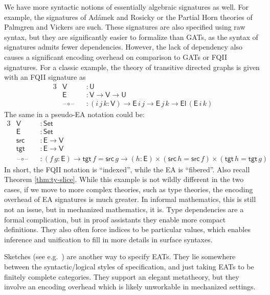 \documentclass[12pt,a4paper,twoside,openany]{book}
\theoremstyle{remark}
\theoremstyle{definition}
\theoremstyle{theorem}
\newcommand{\ms}[1]{\mathsf{#1}}
\newcommand{\U}{\mathsf{U}}
\newcommand{\El}{\mathsf{El}}
\newcommand{\blank}{\mathord{\hspace{1pt}\text{--}\hspace{1pt}}}
\newcommand{\Set}{\mathsf{Set}}
\begin{document}
We have more syntactic notions of essentially algebraic signatures as well. For
example, the signatures of Adámek and Rosicky
\cite[Section~3.D]{adamek1994locally} or the Partial Horn theories of Palmgren
and Vickers \cite{partialhorn} are such. These signatures are also specified
using raw syntax, but they are significantly easier to formalize than GATs, as
the syntax of signatures admits fewer dependencies. However, the lack of
dependency also causes a significant encoding overhead on comparison to GATs or
FQII signatures. For a classic example, the theory of transitive directed graphs
is given with an FQII signature as
\begin{alignat*}{3}
  & \ms{V} &&: \U\\
  & \ms{E} &&: \ms{V} \to \ms{V} \to \U\\
  & \blank\circ\blank &&: (i\,j\,k : \ms{V}) \to \ms{E}\,i\,j \to \ms{E}\,j\,k \to \El\,(\ms{E}\,i\,k)
\end{alignat*}
The same in a pseudo-EA notation could be:
\begin{alignat*}{3}
  & \ms{V}            &&: \Set\\
  & \ms{E}            &&: \Set\\
  & \ms{src}          &&: \ms{E} \to \ms{V}\\
  & \ms{tgt}          &&: \ms{E} \to \ms{V}\\
  & \blank\circ\blank &&: (f\,g : \ms{E}) \to \ms{tgt}\,f = \ms{src}\,g \to (h : \ms{E}) \times (\ms{src}\,h = \ms{src}\,f) \times (\ms{tgt}\,h = \ms{tgt}\,g)
\end{alignat*}
In short, the FQII notation is ``indexed'', while the EA is ``fibered''. Also
recall Theorem \ref{thm:ty-slice}. While this example is not wildly different in
the two cases, if we move to more complex theories, such as type theories, the
encoding overhead of EA signatures is much greater. In informal mathematics,
this is still not an issue, but in mechanized mathematics, it is. Type
dependencies are a formal complication, but in proof assistants they enable more
compact definitions. They also often force indices to be particular values, which
enables inference and unification to fill in more details in surface syntaxes.

Sketches (see e.g.\ \cite[Section~4]{barr1985toposes}) are another way to
specify EATs. They lie somewhere between the syntactic/logical styles of
specification, and just taking EATs to be finitely complete categories. They
support an elegant metatheory, but they involve an encoding overhead which is
likely unworkable in mechanized settings.
\end{document}
